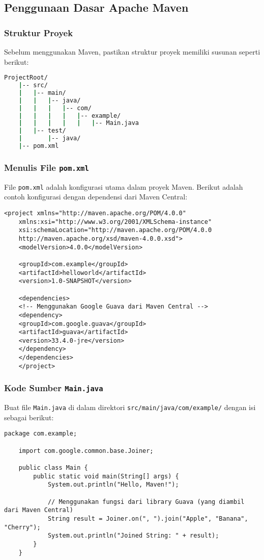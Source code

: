 \subsection{Penggunaan Dasar Apache Maven}
\subsubsection{Struktur Proyek}
Sebelum menggunakan Maven, pastikan struktur proyek memiliki susunan seperti berikut:

\begin{lstlisting}[language=bash]
	ProjectRoot/
	|-- src/
	|   |-- main/
	|   |   |-- java/
	|   |   |   |-- com/
	|   |   |   |   |-- example/
	|   |   |   |   |   |-- Main.java
	|   |-- test/
	|       |-- java/
	|-- pom.xml
\end{lstlisting}

\subsubsection{Menulis File \texttt{pom.xml}}
File \texttt{pom.xml} adalah konfigurasi utama dalam proyek Maven. Berikut adalah contoh konfigurasi dengan dependensi dari Maven Central:

\begin{lstlisting}[style=XmlStyle]
	<project xmlns="http://maven.apache.org/POM/4.0.0"
	xmlns:xsi="http://www.w3.org/2001/XMLSchema-instance"
	xsi:schemaLocation="http://maven.apache.org/POM/4.0.0
	http://maven.apache.org/xsd/maven-4.0.0.xsd">
	<modelVersion>4.0.0</modelVersion>
	
	<groupId>com.example</groupId>
	<artifactId>helloworld</artifactId>
	<version>1.0-SNAPSHOT</version>
	
	<dependencies>
	<!-- Menggunakan Google Guava dari Maven Central -->
	<dependency>
	<groupId>com.google.guava</groupId>
	<artifactId>guava</artifactId>
	<version>33.4.0-jre</version>
	</dependency>
	</dependencies>
	</project>
\end{lstlisting}

\subsubsection{Kode Sumber \texttt{Main.java}}
Buat file \texttt{Main.java} di dalam direktori \texttt{src/main/java/com/example/} dengan isi sebagai berikut:

\begin{lstlisting}[style=JavaStyle]
	package com.example;
	
	import com.google.common.base.Joiner;
	
	public class Main {
		public static void main(String[] args) {
			System.out.println("Hello, Maven!");
			
			// Menggunakan fungsi dari library Guava (yang diambil dari Maven Central)
			String result = Joiner.on(", ").join("Apple", "Banana", "Cherry");
			System.out.println("Joined String: " + result);
		}
	}
\end{lstlisting}

